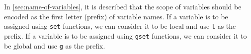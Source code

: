\documentclass{ltugboat}
\begin{document}
In \cref{sec:name-of-variables}, it is described that the scope of variables should be encoded as the first letter (prefix) of variable names.
If a variable is to be assigned using \verb|set| functions, we can consider it to be local and use \verb|l| as the prefix.
If a variable is to be assigned using \verb|gset| functions, we can consider it to be global and use \verb|g| as the prefix.




\makesignature
\end{document}
